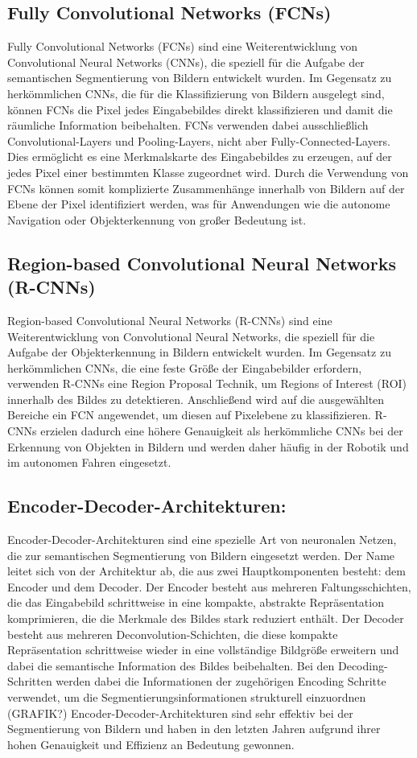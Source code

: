 \subsection{Fully Convolutional Networks (FCNs)}
Fully Convolutional Networks (FCNs) sind eine Weiterentwicklung von
Convolutional Neural Networks (CNNs), die speziell für die Aufgabe der
semantischen Segmentierung von Bildern entwickelt wurden. Im Gegensatz zu
herkömmlichen CNNs, die für die Klassifizierung von Bildern ausgelegt sind,
können FCNs die Pixel jedes Eingabebildes direkt klassifizieren und damit die
räumliche Information beibehalten. FCNs verwenden dabei ausschließlich
Convolutional-Layers und Pooling-Layers, nicht aber Fully-Connected-Layers.
Dies ermöglicht es eine Merkmalskarte des Eingabebildes zu erzeugen, auf der
jedes Pixel einer bestimmten Klasse zugeordnet wird. Durch die Verwendung von
FCNs können somit komplizierte Zusammenhänge innerhalb von Bildern auf der
Ebene der Pixel identifiziert werden, was für Anwendungen wie die autonome
Navigation oder Objekterkennung von großer Bedeutung ist. \cite{7298965}

\subsection{Region-based Convolutional Neural Networks (R-CNNs)}
Region-based Convolutional Neural Networks (R-CNNs) sind eine Weiterentwicklung
von Convolutional Neural Networks, die speziell für die Aufgabe der
Objekterkennung in Bildern entwickelt wurden. Im Gegensatz zu herkömmlichen
CNNs, die eine feste Größe der Eingabebilder erfordern, verwenden R-CNNs eine
Region Proposal Technik, um Regions of Interest (ROI) innerhalb des Bildes zu
detektieren. Anschließend wird auf die ausgewählten Bereiche ein FCN
angewendet, um diesen auf Pixelebene zu klassifizieren. R-CNNs erzielen dadurch
eine höhere Genauigkeit als herkömmliche CNNs bei der Erkennung von Objekten in
Bildern und werden daher häufig in der Robotik und im autonomen Fahren
eingesetzt. \cite{8237584}

\subsection{Encoder-Decoder-Architekturen:}
Encoder-Decoder-Architekturen sind eine spezielle Art von neuronalen Netzen,
die zur semantischen Segmentierung von Bildern eingesetzt werden. Der Name
leitet sich von der Architektur ab, die aus zwei Hauptkomponenten besteht: dem
Encoder und dem Decoder. Der Encoder besteht aus mehreren Faltungsschichten,
die das Eingabebild schrittweise in eine kompakte, abstrakte Repräsentation
komprimieren, die die Merkmale des Bildes stark reduziert enthält. Der Decoder
besteht aus mehreren Deconvolution-Schichten, die diese kompakte Repräsentation
schrittweise wieder in eine vollständige Bildgröße erweitern und dabei die
semantische Information des Bildes beibehalten. Bei den Decoding-Schritten
werden dabei die Informationen der zugehörigen Encoding Schritte verwendet, um
die Segmentierungsinformationen strukturell einzuordnen (GRAFIK?)
Encoder-Decoder-Architekturen sind sehr effektiv bei der Segmentierung von
Bildern und haben in den letzten Jahren aufgrund ihrer hohen Genauigkeit und
Effizienz an Bedeutung gewonnen.
